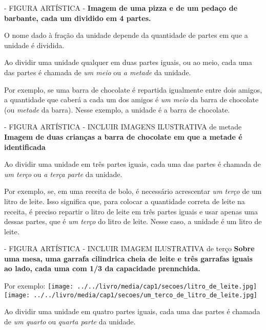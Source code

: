 \documentclass[a4paper,12pt,twoside]{book}
\begin{document}
\begin{imagem*}[breakable]{}{}   - FIGURA ARTÍSTICA -  
  {\bf Imagem de uma pizza e de um pedaço de barbante, cada um dividido em 4 partes.}  
\end{imagem*}

O nome dado à fração da unidade depende da quantidade de partes em que a unidade é dividida. 

Ao dividir uma unidade qualquer em duas partes iguais, ou ao meio, cada uma das partes é chamada de {\it um meio} ou {\it a metade} da unidade. 

Por exemplo, se uma barra de chocolate é repartida igualmente entre dois amigos, a quantidade que caberá a cada um dos amigos é {\it um meio} da barra de chocolate (ou {\it metade} da barra). Nesse exemplo, a unidade é a barra de chocolate.

\begin{imagem*}[breakable]{}{}   - FIGURA ARTÍSTICA - INCLUIR IMAGENS ILUSTRATIVA de metade   
  {\bf Imagem de duas crianças a barra de chocolate em que a metade é identificada}  
\end{imagem*}

Ao dividir uma unidade em três partes iguais, cada uma das partes é chamada de {\it um terço} ou {\it a terça parte} da unidade. 

Por exemplo, se, em uma receita de bolo, é necessário acrescentar {\it um terço} de um litro de leite. Isso significa que, para colocar a quantidade correta de leite na receita, é preciso repartir o litro de leite em três partes iguais e usar apenas uma dessas partes, que é {\it um terço} do litro de leite. Nesse caso, a unidade é um litro de leite.

\begin{imagem*}[breakable]{}{}   - FIGURA ARTÍSTICA - INCLUIR IMAGEM ILUSTRATIVA de terço   
  {\bf Sobre uma mesa, uma garrafa cilindrica cheia de leite e três garrafas iguais ao lado, cada uma com 1/3 da capacidade prennchida.}  
  
  Por exemplo:   
    \texttt{[image: ../../livro/media/cap1/secoes/litro\_de\_leite.jpg]}  
    \texttt{[image: ../../livro/media/cap1/secoes/um\_terco\_de\_litro\_de\_leite.jpg]}  
  
\end{imagem*}

Ao dividir uma unidade em quatro partes iguais, cada uma das partes é chamada de {\it um quarto} ou {\it quarta parte} da unidade. 
\end{document}

